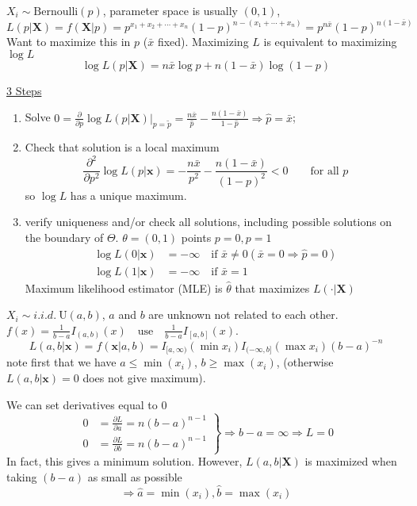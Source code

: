 \documentclass[english, 11pt]{article}
\begin{document}
\begin{exmp}\label{exmp:315}
$X_i\sim\text{Bernoulli}(p)$, parameter space is usually $(0, 1)$,
$$
L(p|\bm{X})=f(\bm{X}|p)=p^{x_1+x_2+\cdots+x_n}(1-p)^{n-(x_1+\cdots+x_n)}=p^{n\bar{x}}(1-p)^{n(1-\bar{x})}
$$
Want to maximize this in $p$ ($\bar{x}$ fixed). Maximizing $L$ is equivalent to maximizing $\log L$
$$
\log L(p|\bm{X})=n\bar{x}\log p+n(1-\bar{x})\log (1-p)
$$

\underline{3 Steps}
\begin{enumerate}[1).]
\item Solve $0=\frac{\partial}{\partial p}\log L(p|\bm{X})\big|_{p=\tilde{p}}=\frac{n\bar{x}}{\hat{p}}-\frac{n(1-\bar{x})}{1-\hat{p}}\Rightarrow \hat{p}=\bar{x}$;
\item Check that solution is a local maximum
$$
\frac{\partial^2}{\partial p^2}\log L(p|\bm{x})=-\frac{n\bar{x}}{p^2}-\frac{n(1-\bar{x})}{(1-p)^2}<0\qquad\text{for all }p
$$
so $\log L$ has a unique maximum.
\item verify uniqueness and/or check all solutions, including possible solutions on the boundary of $\Theta$. $\theta=(0, 1)$ points $p=0, p=1$
$$
\begin{aligned}
\log L(0|\bm{x})&=-\infty\quad \text{if }\bar{x}\not=0 (\bar{x}=0\Rightarrow \hat{p}=0)\\
\log L(1|\bm{x})&=-\infty\quad \text{if }\bar{x}=1
\end{aligned}
$$
Maximum likelihood estimator (MLE) is $\hat{\theta}$ that maximizes $L(\cdot|\bm{X})$
\end{enumerate}
\end{exmp}

\begin{exmp}\label{exmp:316}
$X_i\sim i.i.d.~\text{U}(a, b)$, $a$ and $b$ are unknown not related to each other. $f(x)=\frac{1}{b-a}I_{(a, b)}(x)\quad\text{use}\quad\frac{1}{b-a}I_{[a, b]}(x)$.
$$
L(a, b|\bm{x})=f(\bm{x}|a, b)=I_{[a, \infty)}(\min x_i)I_{(-\infty, b]}(\max x_i)(b-a)^{-n}
$$
note first that we have $a\leqslant \min(x_i)$, $b\geqslant \max(x_i)$, (otherwise $L(a, b|\bm{x})=0$ does not give maximum).

We can set derivatives equal to 0
$$
\left.\begin{aligned}
0&=\frac{\partial L}{\partial a}=n(b-a)^{n-1}\\
0&=\frac{\partial L}{\partial b}=n(b-a)^{n-1}
\end{aligned}\right\}\Rightarrow b-a=\infty\Rightarrow L=0
$$
In fact, this gives a minimum solution. However, $L(a, b|\bm{X})$ is maximized when taking $(b-a)$ as small as possible
$$
\Rightarrow \hat{a}=\min(x_i), \hat{b}=\max(x_i)
$$
\end{exmp}
\end{document}
